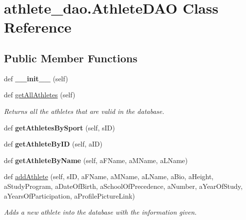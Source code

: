 \hypertarget{classathlete__dao_1_1_athlete_d_a_o}{}\section{athlete\+\_\+dao.\+Athlete\+D\+AO Class Reference}
\label{classathlete__dao_1_1_athlete_d_a_o}
\subsection*{Public Member Functions}
\begin{DoxyCompactItemize}
\item 
\mbox{\label{classathlete__dao_1_1_athlete_d_a_o_adfacea125bbbb750fac16fa6bd82258d}} 
def {\bfseries \+\_\+\+\_\+init\+\_\+\+\_\+} (self)
\item 
def \hyperlink{classathlete__dao_1_1_athlete_d_a_o_a0997bd7936d75e1b9eb391a10c349f8f}{get\+All\+Athletes} (self)
\begin{DoxyCompactList}\small\item\em Returns all the athletes that are valid in the database. \end{DoxyCompactList}\item 
\mbox{\label{classathlete__dao_1_1_athlete_d_a_o_a3a5ce422cb6ae46a7a3b550012e53008}} 
def {\bfseries get\+Athletes\+By\+Sport} (self, s\+ID)
\item 
\mbox{\label{classathlete__dao_1_1_athlete_d_a_o_a695978391803a394007b16e6062f92a3}} 
def {\bfseries get\+Athlete\+By\+ID} (self, a\+ID)
\item 
\mbox{\label{classathlete__dao_1_1_athlete_d_a_o_a08108d52039adb4e1df696bc406d757e}} 
def {\bfseries get\+Athlete\+By\+Name} (self, a\+F\+Name, a\+M\+Name, a\+L\+Name)
\item 
def \hyperlink{classathlete__dao_1_1_athlete_d_a_o_a18a987f0007eb0755d274cee8cfd534c}{add\+Athlete} (self, s\+ID, a\+F\+Name, a\+M\+Name, a\+L\+Name, a\+Bio, a\+Height, a\+Study\+Program, a\+Date\+Of\+Birth, a\+School\+Of\+Precedence, a\+Number, a\+Year\+Of\+Study, a\+Years\+Of\+Participation, a\+Profile\+Picture\+Link)
\begin{DoxyCompactList}\small\item\em Adds a new athlete into the database with the information given. \end{DoxyCompactList}\item 

\end{DoxyCompactItemize}
